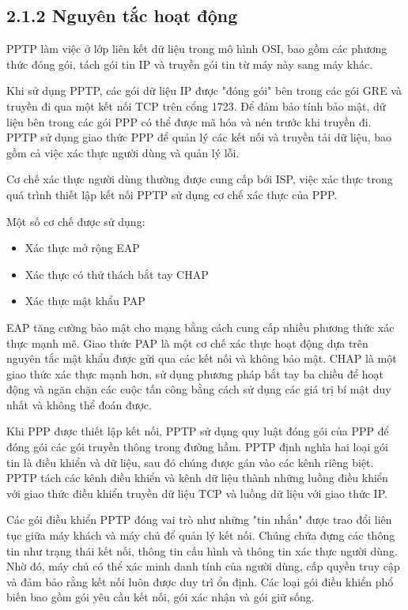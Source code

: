  \subsection*{2.1.2 Nguyên tắc hoạt động}
 
   PPTP làm việc ở lớp liên kết dữ liệu trong mô hình OSI, bao gồm các phương thức đóng gói, tách gói tin IP và truyền gói tin từ máy này sang máy khác.
   
    Khi sử dụng PPTP, các gói dữ liệu IP được "đóng gói" bên trong các gói GRE và truyền đi qua một kết nối TCP trên cổng 1723. Để đảm bảo tính bảo mật, dữ liệu bên trong các gói PPP có thể được mã hóa và nén trước khi truyền đi. PPTP sử dụng giao thức PPP để quản lý các kết nối và truyền tải dữ liệu, bao gồm cả việc xác thực người dùng và quản lý lỗi.

    Cơ chế xác thực người dùng thường được cung cấp bới ISP, việc xác thực trong quá trình thiết lập kết nối PPTP sử dụng cơ chế xác thực của PPP. 
    
    Một số cơ chế được sử dụng:
    \begin{itemize}[left=2.5cm]
        \item Xác thực mở rộng EAP
        \item Xác thực có thử thách bắt tay CHAP
        \item Xác thực mật khẩu PAP
    \end{itemize}

    EAP tăng cường bảo mật cho mạng bằng cách cung cấp nhiều phương thức xác thực mạnh mẽ. Giao thức PAP là một cơ chế xác thực hoạt động dựa trên nguyên tắc mật khẩu được gửi qua các kết nối và không bảo mật. CHAP là một giao thức xác thực mạnh hơn, sử dụng phương pháp bắt tay ba chiều để hoạt động và ngăn chặn các cuộc tấn công bằng cách sử dụng các giá trị bí mật duy nhất và không thể đoán được.
    
    Khi PPP được thiết lập kết nối, PPTP sử dụng quy luật đóng gói của PPP để đóng gói các gói truyền thông trong đường hầm. PPTP định nghĩa hai loại gói tin là điều khiển và dữ liệu, sau đó chúng được gán vào các kênh riêng biệt. PPTP tách các kênh điều khiển và kênh dữ liệu thành những luồng điều khiển với giao thức điều khiển truyền dữ liệu TCP và luồng dữ liệu với giao thức IP.

    Các gói điều khiển PPTP đóng vai trò như những "tin nhắn" được trao đổi liên tục giữa máy khách và máy chủ để quản lý kết nối. Chúng chứa đựng các thông tin như trạng thái kết nối, thông tin cấu hình và thông tin xác thực người dùng. Nhờ đó, máy chủ có thể xác minh danh tính của người dùng, cấp quyền truy cập và đảm bảo rằng kết nối luôn được duy trì ổn định. Các loại gói điều khiển phổ biến bao gồm gói yêu cầu kết nối, gói xác nhận và gói giữ sống.

